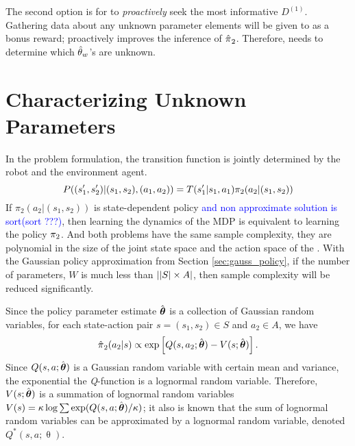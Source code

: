      \par
     The second option is for  to \textit{proactively} seek the most informative $D^{(1)}$.  Gathering data
     about any unknown parameter elements will be given to  as a bonus reward;  proactively improves
     the inference of $\hat{\pi_{}}_2$. Therefore,  needs to determine which
     $\hat{\theta}_{w}$\!'s are unknown.

\section{Characterizing Unknown Parameters}\label{sec:unknown_params}
    In the problem formulation, the transition function is jointly determined by the robot and the environment agent.
    \[
    P((s_1',s_2')|(s_1,s_2),(a_1,a_2)) = T(s_1'|s_1,a_1) \pi_{2}(a_2|(s_1,s_2))
    \]
    If $\pi_2(a_2|(s_1,s_2))$ is state-dependent policy \textcolor{blue}{and non approximate solution is sort(sort
    ???)}, then learning the dynamics of the MDP is equivalent to learning the policy $\pi_{2}$. And both problems
    have the same sample complexity, they are polynomial in the size of the joint state space and the action space of
    the .  With the Gaussian policy approximation from Section \ref{sec:gauss_policy}, if the number of
    parameters, $W$ is much less than $\lvert|S|\times A\rvert$, then sample complexity will be reduced significantly.

    Since the policy parameter estimate $\hat{\boldsymbol{\mathbb{\theta}}}$ is a collection of Gaussian random variables, for each
    state-action pair $s = (s_1,s_2)\in S$ and $a_2\in A$, we have \[
    \hat{\pi_{}}_2(a_2| s) \propto \exp\left[Q(s,a_2;\hat{\boldsymbol{\mathbb{\theta}}}) - V(s;\hat{\boldsymbol{\mathbb{\theta}}})\right].
    \]
    Since $Q(s,a;\hat{\boldsymbol{\mathbb{\theta}}})$ is a Gaussian random variable with certain mean and variance, the exponential
    the \textit{Q}-function is a lognormal random variable.  Therefore, $V(s;\hat{\boldsymbol{\mathbb{\theta}}})$ is a summation of
    lognormal random variables $V(s)=\kappa \log \sum\exp (Q(s,a;\hat{\boldsymbol{\mathbb{\theta}}})/\kappa)$; it also is known that
    the sum of lognormal random variables can be approximated by a lognormal random variable, denoted $Q^\ast(s,a
    ;\uptheta)$.

